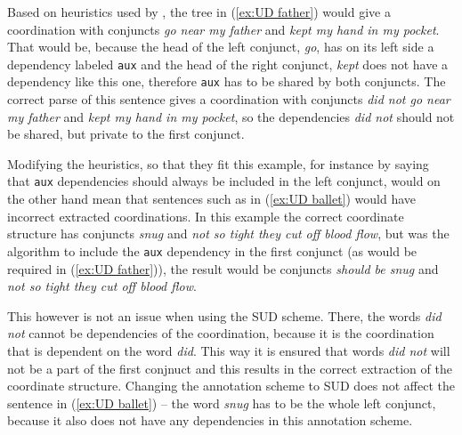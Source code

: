 Based on heuristics used by \cite{pbg2023}, the tree in (\ref{ex:UD father}) would give a coordination with conjuncts \textsl{go near my father} and \textsl{kept my hand in my pocket}. That would be, because the head of the left conjunct, \textsl{go}, has on its left side a dependency labeled \texttt{aux} and the head of the right conjunct, \textsl{kept} does not have a dependency like this one, therefore \texttt{aux} has to be shared by both conjuncts. The correct parse of this sentence gives a coordination with conjuncts \textsl{did not go near my father} and \textsl{kept my hand in my pocket}, so the dependencies \textsl{did not} should not be shared, but private to the first conjunct. 

Modifying the heuristics, so that they fit this example, for instance by saying that \texttt{aux} dependencies should always be included in the left conjunct, would on the other hand mean that sentences such as in (\ref{ex:UD ballet}) would have incorrect extracted coordinations. In this example the correct coordinate structure has conjuncts \textsl{snug} and \textsl{not so tight they cut off blood flow}, but was the algorithm to include the \texttt{aux} dependency in the first conjunct (as would be required in (\ref{ex:UD father})), the result would be conjuncts \textsl{should be snug} and \textsl{not so tight they cut off blood flow}.

This however is not an issue when using the SUD scheme. There, the words \textsl{did not} cannot be dependencies of the coordination, because it is the coordination that is dependent on the word \textsl{did}. This way it is ensured that words \textsl{did not} will not be a part of the first conjnuct and this results in the correct extraction of the coordinate structure. Changing the annotation scheme to SUD does not affect the sentence in (\ref{ex:UD ballet}) -- the word \textsl{snug} has to be the whole left conjunct, because it also does not have any dependencies in this annotation scheme.


